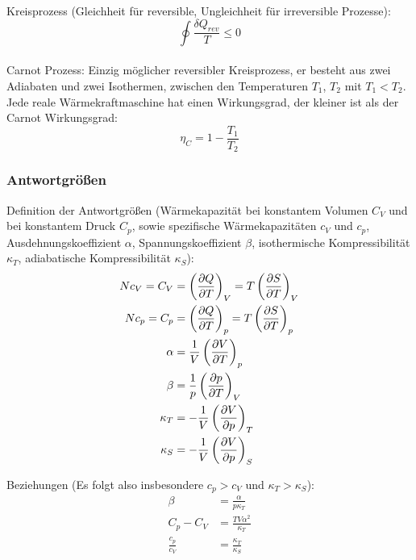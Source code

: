 \documentclass[11pt]{article}
\numberwithin{equation}{section}
\begin{document}
        Kreisprozess (Gleichheit für reversible, Ungleichheit für irreversible Prozesse):
        \begin{equation}
          \oint \frac{\delta Q_{rev}}{T} \le 0
        \end{equation}\\

        Carnot Prozess: Einzig möglicher reversibler Kreisprozess, er besteht aus zwei Adiabaten und zwei Isothermen, zwischen den Temperaturen $T_1$, $T_2$ mit $T_1 < T_2$. Jede reale Wärmekraftmaschine hat einen Wirkungsgrad, der kleiner ist als der Carnot Wirkungsgrad:
        \begin{equation}
          \eta_C = 1-\frac{T_1}{T_2}
        \end{equation}

      \subsubsection{Antwortgrößen}
        Definition der Antwortgrößen (Wärmekapazität bei konstantem Volumen $C_V$ und bei konstantem Druck $C_p$, sowie spezifische Wärmekapazitäten $c_V$ und $c_p$, Ausdehnungskoeffizient $\alpha$, Spannungskoeffizient $\beta$, isothermische Kompressibilität $\kappa_T$, adiabatische Kompressibilität $\kappa_S$):
        \begin{equation}
          \begin{aligned}
            N c_V = C_V &= \left( \frac{\partial Q}{\partial T} \right)_V = T \left( \frac{\partial S}{\partial T} \right)_V \\
            N c_p = C_p &= \left( \frac{\partial Q}{\partial T} \right)_p = T \left( \frac{\partial S}{\partial T} \right)_p \\
            \alpha &= \frac{1}{V} \left( \frac{\partial V}{\partial T} \right)_p \\
            \beta &= \frac{1}{p} \left( \frac{\partial p}{\partial T} \right)_V \\
            \kappa_T &= -\frac{1}{V} \left( \frac{\partial V}{\partial p} \right)_T \\
            \kappa_S &= -\frac{1}{V} \left( \frac{\partial V}{\partial p} \right)_S \\
          \end{aligned}
        \end{equation}

        Beziehungen (Es folgt also insbesondere $c_p > c_V$ und
        $\kappa_T > \kappa_S$):
        \begin{equation}
          \begin{aligned}
            \beta &= \frac{\alpha}{p \kappa_T} \\
            C_p - C_V &= \frac{TV\alpha^2}{\kappa_T} \\
            \frac{c_p}{c_V} &= \frac{\kappa_T}{\kappa_S} \\
          \end{aligned}
        \end{equation}
\end{document}
